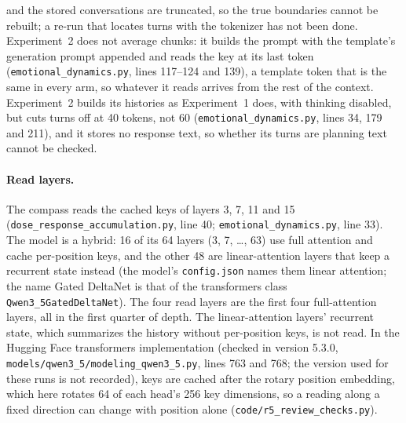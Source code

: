 \documentclass[11pt,a4paper]{article}
\begin{document}
and the stored conversations are truncated, so the true boundaries cannot
be rebuilt; a re-run that locates turns with the tokenizer has not been
done.
Experiment~2 does not average chunks: it builds the prompt with the template's generation prompt appended and reads the key at its last token
(\texttt{emotional\_dynamics.py}, lines 117--124 and 139), a template
token that is the same in every arm, so whatever it reads arrives from
the rest of the context. Experiment~2 builds its histories as Experiment~1 does, with thinking
disabled, but cuts turns off at 40 tokens, not 60
(\texttt{emotional\_dynamics.py}, lines 34, 179 and 211), and it stores no response text, so whether its turns are planning text cannot be checked.

\paragraph{Read layers.} {\sloppy The compass reads the cached keys of layers 3,
7, 11 and 15 (\texttt{dose\_response\_\allowbreak accumulation.py}, line 40;
\texttt{emotional\_dynamics.py}, line 33). The model is a hybrid: 16 of
its 64 layers (3, 7, \ldots, 63) use full attention and cache
per-position keys, and the other 48 are linear-attention layers that keep a recurrent state
instead (the model's \texttt{config.json} names them linear attention; the
name Gated DeltaNet is that of the transformers class
\texttt{Qwen3\_5\allowbreak GatedDeltaNet}). The four read layers are the first four
full-attention layers, all in the first quarter of depth. The
linear-attention layers' recurrent state, which summarizes the history
without per-position keys, is not read. In the Hugging Face transformers
implementation (checked in version 5.3.0,
\texttt{models/\allowbreak qwen3\_5/\allowbreak modeling\_qwen3\_5.py}, lines 763 and 768; the
version used for these runs is not recorded), keys are cached after the
rotary position embedding, which here rotates 64 of each head's 256 key
dimensions, so a reading along a fixed direction can change with
position alone (\texttt{code/r5\_review\_checks.py}).\par}

\end{document}
